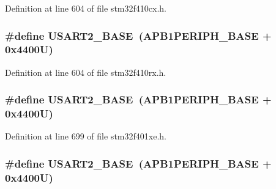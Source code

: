 Definition at line 604 of file stm32f410cx.\+h.

\subsubsection[{\texorpdfstring{U\+S\+A\+R\+T2\+\_\+\+B\+A\+SE}{USART2_BASE}}]{\setlength{\rightskip}{0pt plus 5cm}\#define U\+S\+A\+R\+T2\+\_\+\+B\+A\+SE~({\bf A\+P\+B1\+P\+E\+R\+I\+P\+H\+\_\+\+B\+A\+SE} + 0x4400\+U)}\hypertarget{group___peripheral__registers__structures_gade83162a04bca0b15b39018a8e8ec090}{}\label{group___peripheral__registers__structures_gade83162a04bca0b15b39018a8e8ec090}


Definition at line 604 of file stm32f410rx.\+h.

\subsubsection[{\texorpdfstring{U\+S\+A\+R\+T2\+\_\+\+B\+A\+SE}{USART2_BASE}}]{\setlength{\rightskip}{0pt plus 5cm}\#define U\+S\+A\+R\+T2\+\_\+\+B\+A\+SE~({\bf A\+P\+B1\+P\+E\+R\+I\+P\+H\+\_\+\+B\+A\+SE} + 0x4400\+U)}\hypertarget{group___peripheral__registers__structures_gade83162a04bca0b15b39018a8e8ec090}{}\label{group___peripheral__registers__structures_gade83162a04bca0b15b39018a8e8ec090}


Definition at line 699 of file stm32f401xe.\+h.

\subsubsection[{\texorpdfstring{U\+S\+A\+R\+T2\+\_\+\+B\+A\+SE}{USART2_BASE}}]{\setlength{\rightskip}{0pt plus 5cm}\#define U\+S\+A\+R\+T2\+\_\+\+B\+A\+SE~({\bf A\+P\+B1\+P\+E\+R\+I\+P\+H\+\_\+\+B\+A\+SE} + 0x4400\+U)}\hypertarget{group___peripheral__registers__structures_gade83162a04bca0b15b39018a8e8ec090}{}\label{group___peripheral__registers__structures_gade83162a04bca0b15b39018a8e8ec090}


